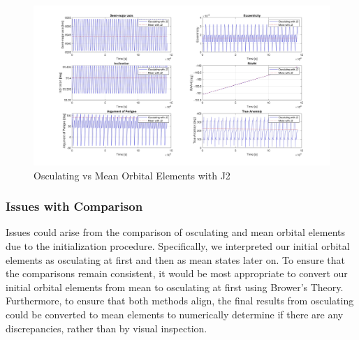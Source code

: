\begin{figure}[H]
    \centering
    \includegraphics[width=1.1\linewidth]{PS1/Figures/OE_mean_osc_J2_comparison.jpg}
    \caption{Osculating vs Mean Orbital Elements with J2}
    \label{fig:osc_mean_oe}
\end{figure}

\subsubsection{Issues with Comparison}\label{sec:comp_issues}
Issues could arise from the comparison of osculating and mean orbital elements due to the initialization procedure. Specifically, we interpreted our initial orbital elements as osculating at first and then as mean states later on. To ensure that the comparisons remain consistent, it would be most appropriate to convert our initial orbital elements from mean to osculating at first using Brower's Theory. Furthermore, to ensure that both methods align, the final results from osculating could be converted to mean elements to numerically determine if there are any discrepancies, rather than by visual inspection.
